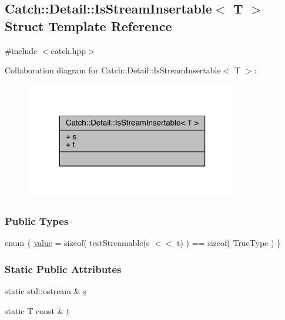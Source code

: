 \hypertarget{a00043}{}\subsection{Catch\+:\+:Detail\+:\+:Is\+Stream\+Insertable$<$ T $>$ Struct Template Reference}
\label{a00043}


{\ttfamily \#include $<$catch.\+hpp$>$}



Collaboration diagram for Catch\+:\+:Detail\+:\+:Is\+Stream\+Insertable$<$ T $>$\+:\nopagebreak
\begin{figure}[H]
\begin{center}
\leavevmode
\includegraphics[width=266pt]{a00303}
\end{center}
\end{figure}
\subsubsection*{Public Types}
\begin{DoxyCompactItemize}
\item 
enum \{ \hyperlink{a00043_a2e4508694da3bf368ff67733a7970edda765a324929702bfce2969fc19fc4f926}{value} = sizeof( test\+Streamable(s $<$$<$ t) ) == sizeof( True\+Type )
 \}
\end{DoxyCompactItemize}
\subsubsection*{Static Public Attributes}
\begin{DoxyCompactItemize}
\item 
static std\+::ostream \& \hyperlink{a00043_abe3d3c8e5d85665747faafffc9a96b00}{s}
\item 
static T const \& \hyperlink{a00043_a7d2a3da978b6736667a7b2f6d51f507f}{t}
\end{DoxyCompactItemize}


